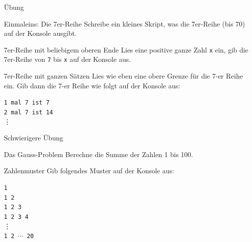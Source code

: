 \documentclass[algorithm,pgfplots,colortheme=dark]{cuzbeamer}
\newcommand{\py}[1]{\texttt{#1}}
\begin{document}
\begin{frame}{Übung}

\begin{block}{Einmaleins: Die 7er-Reihe}
	\vspace{2pt}
Schreibe ein kleines Skript, was die 7er-Reihe (bis 70) auf der Konsole ausgibt.	
\end{block}

\vspace{12pt}

\pause 

\begin{block}{7er-Reihe mit beliebigem oberen Ende}
	\vspace{2pt}
	Lies eine positive ganze Zahl \py{x} ein, gib die 7er-Reihe von \py{7} bis \py{x} auf der Konsole aus.  
\end{block}

\vspace{12pt}

\pause 

\begin{block}{7er-Reihe mit ganzen Sätzen}
	\vspace{2pt}
Lies wie eben eine obere Grenze für die 7-er Reihe ein. Gib dann die 7-er Reihe wie folgt auf der Konsole aus:

\texttt{1 mal 7 ist 7}\\	
\texttt{2 mal 7 ist 14}\\
\phantom{4 mal} \vdots

\end{block}
\end{frame}


\begin{frame}{Schwierigere Übung}

\begin{block}{Das Gauss-Problem}
\vspace{2pt}	
Berechne die Summe der Zahlen 1 bis 100. 
\end{block}
\vspace{12pt}
\pause
\begin{block}{Zahlenmuster}
\vspace{2pt}	
Gib folgendes Muster auf der Konsole aus: 

\texttt{1} \\
\texttt{1 2} \\
\texttt{1 2 3} \\
\texttt{1 2 3 4} \\
\phantom{1 2 } \vdots \\
\texttt{1 2 $\cdots$ 20}
\end{block}

\end{frame}
\end{document}
